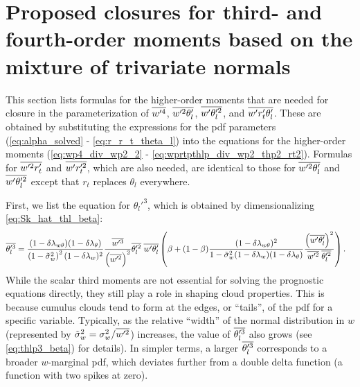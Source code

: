 \section{Proposed closures for third- and fourth-order moments based on the mixture of trivariate normals}
\label{sec:prop_closure}

This section lists formulas for the higher-order moments that are needed for closure
in the parameterization of $\overline{w'^4}$, $\overline{w'^2 \theta_l'}$, $\overline{w' \theta_l'^2}$, and $\overline{w' r_t' \theta_l'}$.
These are obtained by substituting the expressions for the \gls{pdf} parameters
(\cref{eq:alpha_solved} - \cref{eq:r_r_t_theta_l}) into the equations for the higher-order moments
(\cref{eq:wp4_div_wp2_2} - \cref{eq:wprtpthlp_div_wp2_thp2_rt2}).
Formulas for $\overline{w'^2 r_t'}$ and $\overline{w' r_t'^2}$,
which are also needed,
are identical to those for $\overline{w'^2 \theta_l'}$ and $\overline{w' \theta_l'^2}$ except that $r_t$ replaces $\theta_l$ everywhere.

First, we list the equation for $\theta_l'^3$, which is obtained by dimensionalizing \cref{eq:Sk_hat_thl_beta}:
\begin{align}
    \label{eq:thlp3_beta}
    \overline{\theta_l'^3}
    &= \frac{(1-\delta \lambda_{w \theta})(1-\delta \lambda_\theta)}{\left( 1 - \tilde{\sigma}_w^2 \right)^2 (1-\delta \lambda_w)^2}
    \frac{\overline{w'^3}}{\left( \overline{w'^2} \right)^2}
    \overline{\theta_l'^2} \;
    \overline{w'\theta_l'}
    \left(\beta + (1-\beta)
    \frac{(1-\delta \lambda_{w \theta})^2}{1-\tilde{\sigma}_w^2 (1-\delta \lambda_w)(1-\delta \lambda_\theta)}
    \frac{\left(\overline{w'\theta_l'}\right)^2}{\overline{w'^2} \; \overline{\theta_l'^2}}\right).
\end{align}
While the scalar third moments are not essential for solving the prognostic equations directly,
they still play a role in shaping cloud properties.
This is because cumulus clouds tend to form at the edges,
or \enquote{tails}, of the \gls{pdf} for a specific variable.
Typically, as the relative \enquote{width} of the normal distribution in $w$
(represented by ${\tilde{\sigma}_w}^2=\sigma_w^2/\overline{w'^2}$) increases,
the value of $\overline{\theta_l'^3}$ also grows (see \cref{eq:thlp3_beta}) for details).
In simpler terms,
a larger $\overline{\theta_l'^3}$ corresponds to a broader $w$-marginal \gls{pdf},
which deviates further from a double delta function (a function with two spikes at zero).

